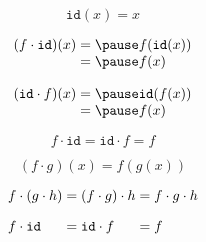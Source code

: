\documentclass[aspectratio=169]{beamer}
\begin{document}
\begin{frame}

%

\begin{equation*}
\mathtt{id}(x) = x
\end{equation*}

\pause

\begin{equation*}
\begin{array}{l@{\;=\;}l}
(f \cdot \mathtt{id})(x) & \pause f(\mathtt{id}(x)) \\
& \pause f(x)
\end{array}
\end{equation*}

\pause

\begin{equation*}
\begin{array}{l@{\;=\;}l}
(\mathtt{id} \cdot f)(x) & \pause \mathtt{id}(f(x)) \\
& \pause f(x)
\end{array}
\end{equation*}

\pause

\begin{equation*}
f \cdot \mathtt{id} = \mathtt{id} \cdot f = f
\end{equation*}

\end{frame}

\begin{frame}

\begin{equation*}
(f \cdot g)(x) = f(g(x))
\end{equation*}

\vspace{1em}

\begin{equation*}
\begin{array}{l@{\;=\;}l@{\;=\;}l}
f \cdot (g \cdot h) & (f \cdot g) \cdot h & f \cdot g \cdot h \\[1em]
f \cdot \mathtt{id} & \mathtt{id} \cdot f & f
\end{array}
\end{equation*}

\end{frame}
\end{document}
